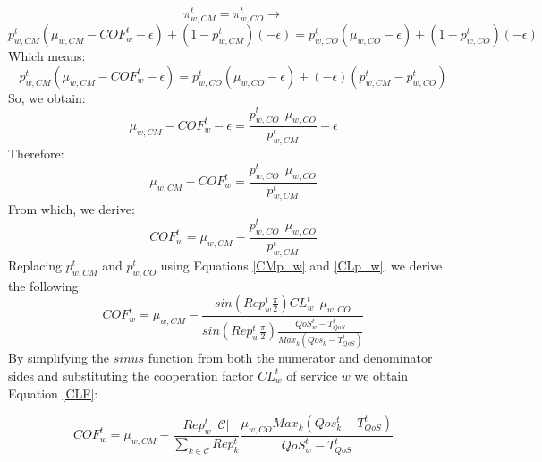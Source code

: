 \begin{equation*}\label{equit}
\pi_{w,CM}^t=\pi_{w,CO}^t      \rightarrow
\end{equation*}
\begin{equation*}
p_{w,CM}^t(\mu_{w,CM}-COF_w^t-\epsilon)+(1-p_{w,CM}^t)(-\epsilon)=p_{w,CO}^t(\mu_{w,
CO}-\epsilon)+(1-p_{w,CO}^t)(-\epsilon)
\end{equation*}
Which means:
\begin{equation*}
p_{w,CM}^t(\mu_{w,CM}-COF_w^t - \epsilon) =
p_{w,CO}^t(\mu_{w,CO}-\epsilon)+(-\epsilon)(p_{w,CM}^t -
p_{w,CO}^t)
\end{equation*}
So, we obtain:
\begin{equation*}
\mu_{w,CM}-COF_w^t - \epsilon =
\frac{p_{w,CO}^t~~\mu_{w,CO}}{p_{w,CM}^t}-\epsilon
\end{equation*}
Therefore:
\begin{equation*}
\mu_{w,CM}-COF_w^t = \frac{p_{w,CO}^t~~\mu_{w,CO}}{p_{w,CM}^t}
\end{equation*}
From which, we derive:
\begin{equation*}
COF_w^t = \mu_{w,CM} - \frac{p_{w,CO}^t~~\mu_{w,CO}}{p_{w,CM}^t}
\end{equation*}
Replacing $p_{w,CM}^t$ and $p_{w,CO}^t$ using Equations
\ref{CMp_w} and \ref{CLp_w}, we derive the following:
\begin{equation*}
COF_w^t = \mu_{w,CM} -
\frac{sin(Rep^t_w\frac{\pi}{2})CL_w^t~~\mu_{w,CO}}{sin(Rep^t_w\frac{\pi}{2})\frac{QoS_w^t-T_{QoS}^t}{Max_k(Qos_k-T_{QoS}^t)}}
\end{equation*}
%
By simplifying the $sinus$ function from both the numerator and
denominator sides and substituting the cooperation factor $CL_w^t$
of service $w$ we obtain Equation \ref{CLF}:

\begin{equation}\label{CLF}
COF_w^t=\mu_{w,CM}-\frac{Rep^t_w~|\mathcal{C}|}{\sum_{k\in
\mathcal{C}}Rep^t_k}\frac{\mu_{w,CO}Max_k(Qos_k^t-T_{QoS}^t)}{QoS_w^t-T_{QoS}^t}
\end{equation}


